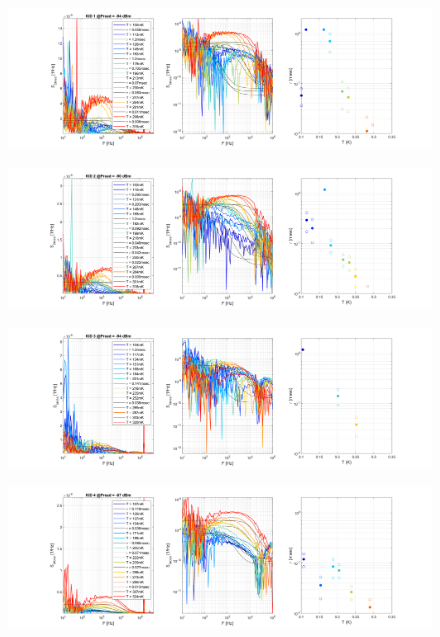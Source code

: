 \begin{figure}[ht]
	\centering
	\includegraphics[width=\linewidth]{../Data_Analysis_scripts_ADR/CrossPSD2D/crossPSD_Popt images/KID1P_94_crossPSD_Tdep.png}
	\caption{}
	\label{fig:}
\end{figure}
\begin{figure}[ht]
	\centering
	\includegraphics[width=\linewidth]{../Data_Analysis_scripts_ADR/CrossPSD2D/crossPSD_Popt images/KID2P_90_crossPSD_Tdep.png}
	\caption{}
	\label{fig:}
\end{figure}
\begin{figure}[ht]
	\centering
	\includegraphics[width=\linewidth]{../Data_Analysis_scripts_ADR/CrossPSD2D/crossPSD_Popt images/KID3P_94_crossPSD_Tdep.png}
	\caption{}
	\label{fig:}
\end{figure}
\begin{figure}[ht]
	\centering
	\includegraphics[width=\linewidth]{../Data_Analysis_scripts_ADR/CrossPSD2D/crossPSD_Popt images/KID4P_87_crossPSD_Tdep.png}
	\caption{}
	\label{fig:}
\end{figure}
